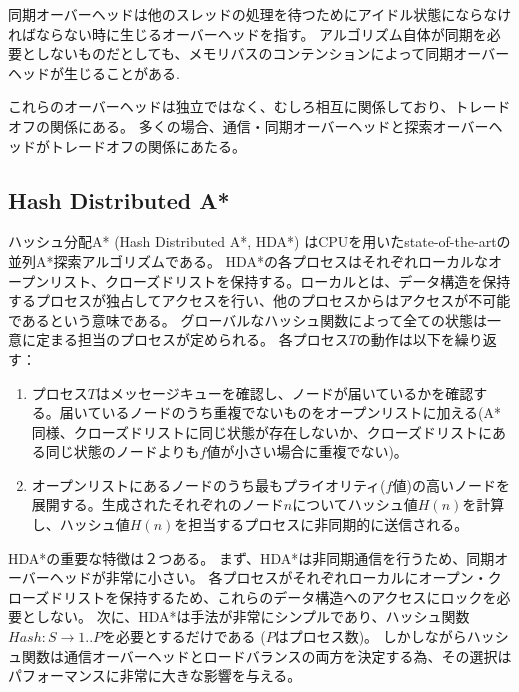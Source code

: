 \documentclass{report}
\begin{document}
同期オーバーヘッドは他のスレッドの処理を待つためにアイドル状態にならなければならない時に生じるオーバーヘッドを指す。
アルゴリズム自体が同期を必要としないものだとしても、メモリバスのコンテンションによって同期オーバーヘッドが生じることがある\cite{burnslrz10,kishimotofb13}.


これらのオーバーヘッドは独立ではなく、むしろ相互に関係しており、トレードオフの関係にある。
多くの場合、通信・同期オーバーヘッドと探索オーバーヘッドがトレードオフの関係にあたる。

\subsection{Hash Distributed A*}

ハッシュ分配A* (Hash Distributed A*, HDA*) \cite{kishimotofb13}はCPUを用いたstate-of-the-artの並列A*探索アルゴリズムである。
HDA*の各プロセスはそれぞれローカルなオープンリスト、クローズドリストを保持する。ローカルとは、データ構造を保持するプロセスが独占してアクセスを行い、他のプロセスからはアクセスが不可能であるという意味である。
グローバルなハッシュ関数によって全ての状態は一意に定まる担当のプロセスが定められる。
各プロセス$T$の動作は以下を繰り返す：

\begin{enumerate}
	\item 
		プロセス$T$はメッセージキューを確認し、ノードが届いているかを確認する。届いているノードのうち重複でないものをオープンリストに加える(A*同様、クローズドリストに同じ状態が存在しないか、クローズドリストにある同じ状態のノードよりも$f$値が小さい場合に重複でない)。
	\item 
		オープンリストにあるノードのうち最もプライオリティ($f$値)の高いノードを展開する。生成されたそれぞれのノード$n$についてハッシュ値$H(n)$を計算し、ハッシュ値$H(n)$を担当するプロセスに非同期的に送信される。
\end{enumerate}

HDA*の重要な特徴は２つある。
まず、HDA*は非同期通信を行うため、同期オーバーヘッドが非常に小さい。
各プロセスがそれぞれローカルにオープン・クローズドリストを保持するため、これらのデータ構造へのアクセスにロックを必要としない。
次に、HDA*は手法が非常にシンプルであり、ハッシュ関数$Hash: S \rightarrow {1..P}$を必要とするだけである ($P$はプロセス数)。
しかしながらハッシュ関数は通信オーバーヘッドとロードバランスの両方を決定する為、その選択はパフォーマンスに非常に大きな影響を与える。
\end{document}
